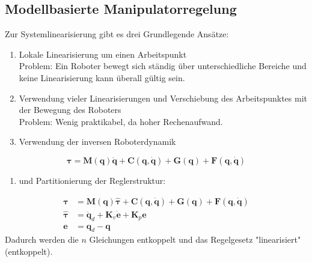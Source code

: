 \documentclass[a4paper, 11pt, accentcolor = tud3b]{tudreport}
\newcommand{\mat}[1]{\boldsymbol{#1}}
\renewcommand{\vec}[1]{\boldsymbol{\mathbf{#1}}}
\begin{document}
			\subsection{Modellbasierte Manipulatorregelung}
				Zur Systemlinearisierung gibt es drei Grundlegende Ansätze:
				\begin{enumerate}
					\item Lokale Linearisierung um einen Arbeitspunkt \\ Problem: Ein Roboter bewegt sich ständig über unterschiedliche Bereiche und keine Linearisierung kann überall gültig sein.
					\item Verwendung vieler Linearisierungen und Verschiebung des Arbeitspunktes mit der Bewegung des Roboters \\ Problem: Wenig praktikabel, da hoher Rechenaufwand.
					\item Verwendung der inversen Roboterdynamik
				\end{enumerate}
				\begin{equation*}
					\vec{\tau} = \mat{M}(\vec{q}) \ddot{\vec{q}} + \vec{C}(\vec{q}, \dot{\vec{q}}) + \vec{G}(\vec{q}) + \vec{F}(\vec{q}, \dot{\vec{q}})
				\end{equation*}
				\begin{enumerate}
					\item[] und Partitionierung der Reglerstruktur:
				\end{enumerate}
				\vspace{-0.5cm}
				\begin{align*}
					\vec{\tau}       & = \mat{M}(\vec{q})\hat{\vec{\tau}} + \vec{C}(\vec{q}, \dot{\vec{q}}) + \vec{G}(\vec{q}) + \vec{F}(\vec{q}, \dot{\vec{q}}) \\
					\hat{\vec{\tau}} & = \ddot{\vec{q}}_d + \mat{K}_v \dot{\vec{e}} + \mat{K}_p \vec{e}                                                          \\
					\vec{e}          & = \vec{q}_d - \vec{q}
				\end{align*}
				Dadurch werden die \(n\) Gleichungen entkoppelt und das Regelgesetz "linearisiert" (entkoppelt).
				
\end{document}
